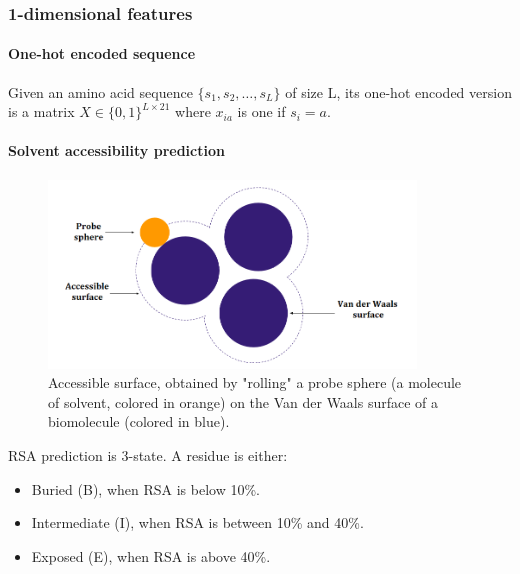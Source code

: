     \subsubsection{1-dimensional features}

        \paragraph{One-hot encoded sequence}

            Given an amino acid sequence $\{s_1, s_2, \ldots,
            s_L\}$ of size L, its one-hot encoded version
            is a matrix $X \in \{0, 1\}^{L \times 21}$
            where $x_{ia}$ is one if $s_i = a$.

        \paragraph{Solvent accessibility prediction}

            \todo{}

            \begin{figure}[H]
                \begin{center}
                    \includegraphics[height=5cm, keepaspectratio]{imgs/accessibility.png}
                    \caption{Accessible surface, obtained by "rolling" a probe sphere (a molecule
                        of solvent, colored in orange) on the Van der Waals surface of a biomolecule
                        (colored in blue).}
                    \label{architecture}
                \end{center}
            \end{figure}

            RSA prediction is 3-state. A residue is either:
            \begin{itemize}
                \item Buried (B), when RSA is below 10\%.
                \item Intermediate (I), when RSA is between 10\% and 40\%.
                \item Exposed (E), when RSA is above 40\%.
            \end{itemize}


